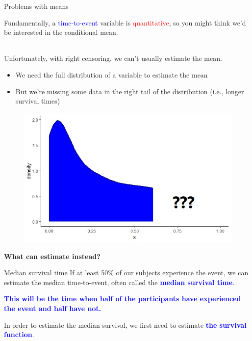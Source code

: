 \documentclass[10pt,t]{beamer}
\begin{document}
\begin{frame}{Problems with means}
	
	\vspace{-7 mm}
	
	Fundamentally, a \textcolor{blue}{time-to-event} variable is \textcolor{red}{quantitative}, so you might think we'd be interested in the conditional mean.
	\\ ~\ 
	
	Unfortunately, with right censoring, we can't usually estimate the mean.  
	\begin{itemize}
		\medskip
		\item We need the full distribution of a variable to estimate the mean
		\medskip
		
		\item But we're missing some data in the right tail of the distribution (i.e., longer survival times)
	\end{itemize}
	\begin{figure}
		\centering
		\includegraphics[scale = 0.3]{figs/mean_plot}
	\end{figure}
	\textbf{What can estimate instead?} 
\end{frame}

\begin{frame}{Median survival time}
	If at least 50\% of our subjects experience the event, we can estimate the median time-to-event, often called the \textbf{\textcolor{blue}{median survival time}}.
	
	\bigskip
	
	\textbf{\textcolor{blue}{This will be the time when half of the participants have experienced the event and half have not.}}
	
	\bigskip 
	
	In order to estimate the median survival, we first need to estimate \textbf{\textcolor{blue}{the survival function}}.
\end{frame}
\end{document}
